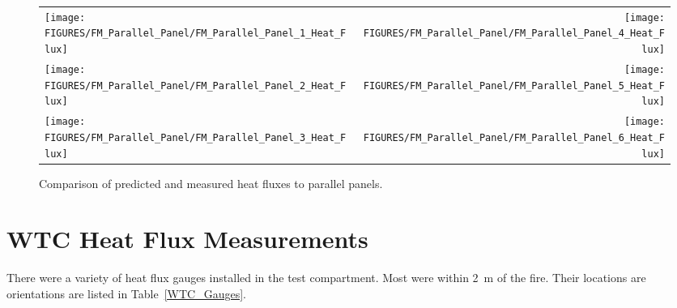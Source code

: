 \begin{figure}[p]
\begin{tabular*}{\textwidth}{l@{\extracolsep{\fill}}r}
\texttt{[image: FIGURES/FM\_Parallel\_Panel/FM\_Parallel\_Panel\_1\_Heat\_Flux]} &
\texttt{[image: FIGURES/FM\_Parallel\_Panel/FM\_Parallel\_Panel\_4\_Heat\_Flux]} \\
\texttt{[image: FIGURES/FM\_Parallel\_Panel/FM\_Parallel\_Panel\_2\_Heat\_Flux]} &
\texttt{[image: FIGURES/FM\_Parallel\_Panel/FM\_Parallel\_Panel\_5\_Heat\_Flux]} \\
\texttt{[image: FIGURES/FM\_Parallel\_Panel/FM\_Parallel\_Panel\_3\_Heat\_Flux]} &
\texttt{[image: FIGURES/FM\_Parallel\_Panel/FM\_Parallel\_Panel\_6\_Heat\_Flux]}
\end{tabular*}
\label{FM_Parallel_Panel}
\caption[Side wall heat flux predictions, FM Parallel Panel experiments.]
{Comparison of predicted and measured heat fluxes to parallel panels.}
\end{figure}



\clearpage

\section{WTC Heat Flux Measurements}

There were a variety of heat flux gauges installed in the test compartment. Most were within 2~m of the fire. Their locations are orientations are listed in Table~\ref{WTC_Gauges}.

